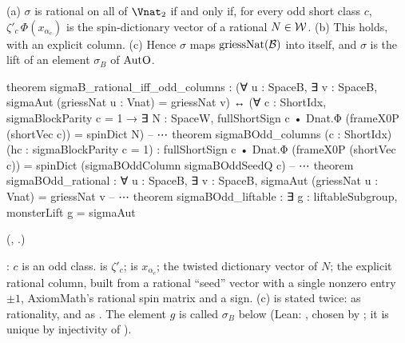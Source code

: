 \begin{theorem}\label{ch22:thm:sigmarational}
(a) $\sigma$ is rational on all of $\Vnat_2$ if and only if, for every odd short class $c$,
$\zeta'_c\,\Phi(x_{\alpha_c})$ is the spin-dictionary vector of a rational $N\in\mathcal{W}$.
(b) This holds, with an explicit column.  (c) Hence $\sigma$ maps $\mathrm{griessNat}(\mathcal{B})$ into itself, and $\sigma$
is the lift of an element $\sigma_B$ of $\mathrm{AutO}$.
\end{theorem}
\begin{leancode}
theorem sigmaB_rational_iff_odd_columns :
    (∀ u : SpaceB, ∃ v : SpaceB, sigmaAut (griessNat u : Vnat) = griessNat v) ↔
      (∀ c : ShortIdx, sigmaBlockParity c = 1 → ∃ N : SpaceW,
        fullShortSign c • Dnat.Φ (frameX0P (shortVec c)) = spinDict N)
-- ⋯
theorem sigmaBOdd_columns (c : ShortIdx) (hc : sigmaBlockParity c = 1) :
    fullShortSign c • Dnat.Φ (frameX0P (shortVec c)) =
      spinDict (sigmaBOddColumn sigmaBOddSeedQ c)
-- ⋯
theorem sigmaBOdd_rational :
    ∀ u : SpaceB, ∃ v : SpaceB, sigmaAut (griessNat u : Vnat) = griessNat v
-- ⋯
theorem sigmaBOdd_liftable : ∃ g : liftableSubgroup, monsterLift g = sigmaAut
\end{leancode}
(, .)
\begin{dictionary}
: $c$ is an odd class.   is $\zeta'_c$; 
is $x_{\alpha_c}$;  the twisted dictionary vector of $N$;  the
explicit rational column, built from a rational ``seed'' vector  with a single nonzero entry
$\pm1$, AxiomMath's rational spin matrix  and a sign.  (c) is stated twice: as rationality, and as
.  The element $g$ is called $\sigma_B$ below (Lean:
, chosen by ; it is unique by injectivity of ).
\end{dictionary}

